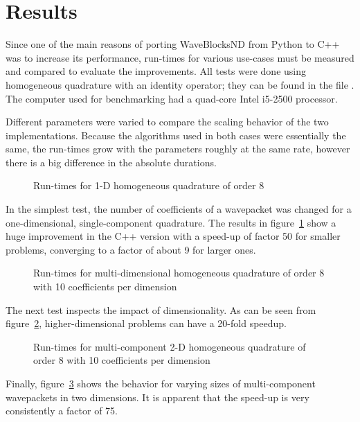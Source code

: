 \section{Results}

Since one of the main reasons of porting WaveBlocksND from Python to C++ was to
increase its performance, run-times for various use-cases must be measured and
compared to evaluate the improvements.
All tests were done using homogeneous quadrature with an identity operator;
they can be found in the file .
The computer used for benchmarking had a quad-core Intel i5-2500 processor.

Different parameters were varied to compare the scaling behavior of the two
implementations.
Because the algorithms used in both cases were essentially the same, the
run-times grow with the parameters roughly at the same rate, however there is a
big difference in the absolute durations.

\begin{figure}
  \center
  
  \caption{Run-times for 1-D homogeneous quadrature of order 8}
  \label{fig:speedup1d}
\end{figure}

In the simplest test, the number of coefficients of a wavepacket was changed
for a one-dimensional, single-component quadrature.
The results in figure~\ref{fig:speedup1d} show a huge improvement in the C++
version with a speed-up of factor 50 for smaller problems, converging to a
factor of about 9 for larger ones.

\begin{figure}
  \center
  
  \caption{Run-times for multi-dimensional homogeneous quadrature of order 8
    with 10 coefficients per dimension}
  \label{fig:speedupnd}
\end{figure}

The next test inspects the impact of dimensionality.
As can be seen from figure~\ref{fig:speedupnd}, higher-dimensional problems can
have a 20-fold speedup.

\begin{figure}
  \center
  
  \caption{Run-times for multi-component 2-D homogeneous quadrature of order 8
    with 10 coefficients per dimension}
  \label{fig:speedupncomps}
\end{figure}

Finally, figure~\ref{fig:speedupncomps} shows the behavior for varying sizes
of multi-component wavepackets in two dimensions.
It is apparent that the speed-up is very consistently a factor of 75.

